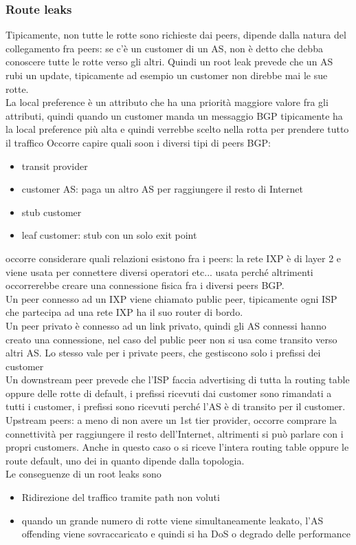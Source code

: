 \documentclass[12pt, oneside]{extbook} %
\begin{document}
\subsubsection{Route leaks}
Tipicamente, non tutte le rotte sono richieste dai peers, dipende dalla natura del collegamento fra peers: se c'è un customer di un AS, non è detto che debba conoscere tutte le rotte verso gli altri. Quindi un root leak prevede che un AS rubi un update, tipicamente ad esempio un customer non direbbe mai le sue rotte.\\La local preference è un attributo che ha una priorità maggiore valore fra gli attributi, quindi quando un customer manda un messaggio BGP tipicamente ha la local preference più alta e quindi verrebbe scelto nella rotta per prendere tutto il traffico
Occorre capire quali soon i diversi tipi di peers BGP:
\begin{itemize}
\item transit provider
\item customer AS: paga un altro AS per raggiungere il resto di Internet
\item stub customer
\item leaf customer: stub con un solo exit point
\end{itemize}
occorre considerare quali relazioni esistono fra i peers: la rete IXP è di layer 2 e viene usata per connettere diversi operatori etc... usata perché altrimenti occorrerebbe creare una connessione fisica fra i diversi peers BGP.\\Un peer connesso ad un IXP viene chiamato public peer, tipicamente ogni ISP che partecipa ad una rete IXP ha il suo router di bordo.\\Un peer privato è connesso ad un link privato, quindi gli AS connessi hanno creato una connessione, nel caso del public peer non si usa come transito verso altri AS. Lo stesso vale per i private peers, che gestiscono solo i prefissi dei customer\\Un downstream peer prevede che l'ISP faccia advertising di tutta la routing table oppure delle rotte di default, i prefissi ricevuti dai customer sono rimandati a tutti i customer, i prefissi sono ricevuti perché l'AS è di transito per il customer.\\Upstream peers: a meno di non avere un 1st tier provider, occorre comprare la connettività per raggiungere il resto dell'Internet, altrimenti si può parlare con i propri customers. Anche in questo caso o si riceve l'intera routing table oppure le route default, uno dei in quanto dipende dalla topologia.\\Le conseguenze di un root leaks sono
\begin{itemize}
\item Ridirezione del traffico tramite path non voluti
\item quando un grande numero di rotte viene simultaneamente leakato, l'AS offending viene sovraccaricato e quindi si ha DoS o degrado delle performance
\end{itemize}
\end{document}
